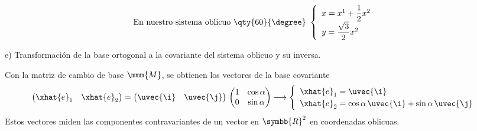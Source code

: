 \[
  \text{En nuestro sistema oblicuo \qty{60}{\degree} }
  \begin{cases}
    \begin{array}{l}
      x = x^1 + \dfrac{1}{2} x^2\\
      y = \dfrac{\sqrt{3}}{2} x^2
    \end{array}
  \end{cases}
\]

\noindent
e) Transformación de la base ortogonal a la covariante del sistema oblicuo y su inversa.

Con la matriz de cambio de base $\mmm{M}$, se obtienen los vectores de la base
covariante
\[
  \begin{pmatrix}
    \xhat{e}_1 & \xhat{e}_2
  \end{pmatrix}
  =\begin{pmatrix}
    \uvec{\i} & \uvec{\j}
  \end{pmatrix}
  \,\begin{pmatrix}
    1 & \cos\alpha\\
    0 & \sin\alpha
  \end{pmatrix}
  \longrightarrow
  \begin{cases}
    \begin{array}{l}
      \xhat{e}_1 = \uvec{\i}\\
      \xhat{e}_2 = \cos\alpha\,\uvec{\i} + \sin\alpha\,\uvec{\j}
    \end{array}
  \end{cases}
\]
Estos vectores miden las componentes contravariantes de un vector en $\symbb{R}^2$ en
coordenadas oblicuas.

